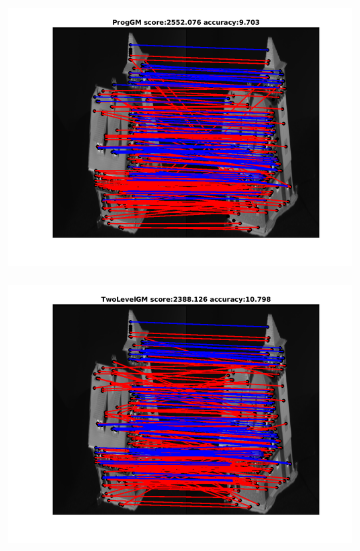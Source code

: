 \documentclass[
	fontsize=12pt,
	paper=a4,
	twoside=false,
	numbers=noenddot,
	plainheadsepline,
	toc=listof,
	toc=bibliography
]{scrartcl}
\begin{document}
\begin{figure}[h] 		
	\begin{subfigure}[b]{0.3\textwidth}
		\centering
		\includegraphics[scale=0.25]{"fig_ver2608/RealImages/House_seq/no_descr/using_cdf_afftrafo/solution/fi_4_ProgGM"}  
	\end{subfigure}%
	\begin{subfigure}[b]{0.3\textwidth}
		\centering
		\includegraphics[scale=0.25]{"fig_ver2608/RealImages/House_seq/no_descr/using_cdf_afftrafo/solution/fi_4_TwoLevelGM"}  
	\end{subfigure} 
	\begin{subfigure}[b]{0.3\textwidth}
		\centering

\end{subfigure}
\end{figure}
\end{document}
